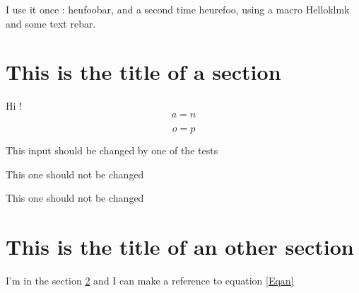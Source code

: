 \documentclass{article}
\newcommand{\MyMacro}[2]{First \emph{#1} and second {\it #2}}
\newcommand{\SecondMacro}{Hello}
\renewcommand{\MyMacro}{heu}
\begin{document}
I use it once : \MyMacro{foo}{bar}, 
and a second time  \MyMacro {refoo, using a macro 
	\SecondMacro{klmk} and some text}
	{rebar}.

\section{This is the title of a section}
\label{SecUne}

Hi !
\begin{equation}		\label{Eqan}
	a=n
\end{equation}

\begin{equation}	\label{Eqop}
	o=p
\end{equation}


This input should be changed by one of the tests

This one should not be changed


This one should not be changed


\section{This is the title of an other section}
\label{SecDeux}


I'm in the section \ref{SecDeux} and I can make a reference to equation \eqref{Eqan}
\end{document}
